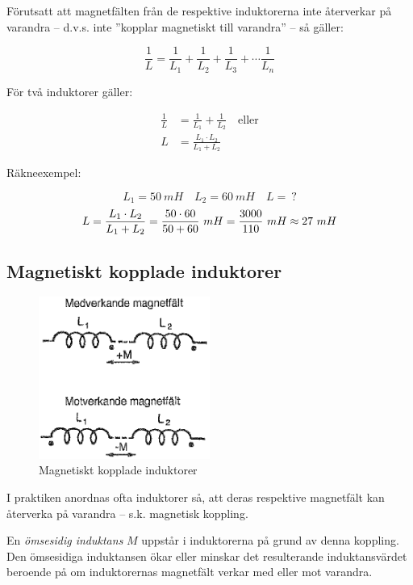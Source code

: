 Förutsatt att magnetfälten från de respektive induktorerna inte återverkar på
varandra -- d.v.s. inte ''kopplar magnetiskt till varandra'' -- så gäller:

\[
\frac{1}{L} = \frac{1}{L_1} + \frac{1}{L_2} + \frac{1}{L_3} +
\cdots \frac{1}{L_n}
\]

För två induktorer gäller:

\begin{align*}
  \frac{1}{L} &= \frac{1}{L_1} + \frac{1}{L_2} \quad \text{eller} \\
  L &= \frac{L_1 \cdot L_2}{L_1 + L_2}
\end{align*}

Räkneexempel:

\[L_1 = 50\ mH \quad L_2 = 60\ mH \quad L =\ ?\]
\[
  L = \frac{L_1 \cdot L_2}{L_1 + L_2} \\
  = \frac{50 \cdot 60}{50 + 60}\ mH \\
  = \frac{3000}{110}\ mH \\
  \approx 27\ mH
\]

\subsection{Magnetiskt kopplade induktorer}

\begin{figure}
\includegraphics[width=0.5\textwidth]{images/bild_2_3-07.png}
\caption{Magnetiskt kopplade induktorer}
\label{fig:BildII3-07}
\end{figure}

I praktiken anordnas ofta induktorer så, att deras respektive magnetfält kan
återverka på varandra -- s.k. magnetisk koppling.

En \emph{ömsesidig induktans} \(M\) uppstår i induktorerna på grund av denna
koppling. Den ömsesidiga induktansen ökar eller minskar det resulterande
induktansvärdet beroende på om induktorernas magnetfält verkar med eller mot
varandra.

